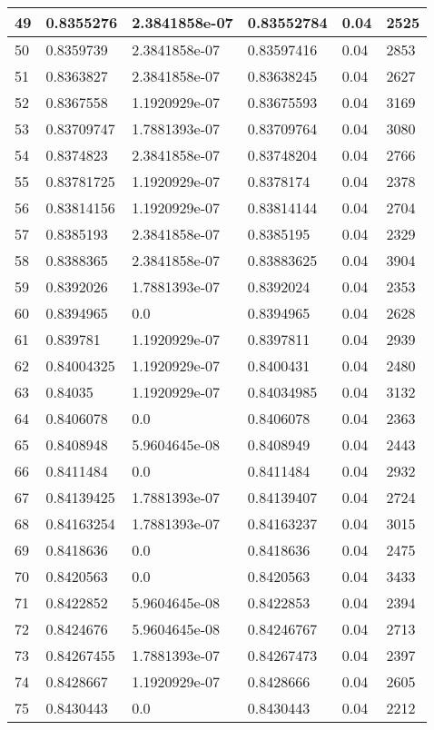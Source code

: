 \begin{longtable}{|l|l|l|l|l|l|}
49 & 0.8355276 & 2.3841858e-07 & 0.83552784 & 0.04 & 2525 \\ \hline 
50 & 0.8359739 & 2.3841858e-07 & 0.83597416 & 0.04 & 2853 \\ \hline 
51 & 0.8363827 & 2.3841858e-07 & 0.83638245 & 0.04 & 2627 \\ \hline 
52 & 0.8367558 & 1.1920929e-07 & 0.83675593 & 0.04 & 3169 \\ \hline 
53 & 0.83709747 & 1.7881393e-07 & 0.83709764 & 0.04 & 3080 \\ \hline 
54 & 0.8374823 & 2.3841858e-07 & 0.83748204 & 0.04 & 2766 \\ \hline 
55 & 0.83781725 & 1.1920929e-07 & 0.8378174 & 0.04 & 2378 \\ \hline 
56 & 0.83814156 & 1.1920929e-07 & 0.83814144 & 0.04 & 2704 \\ \hline 
57 & 0.8385193 & 2.3841858e-07 & 0.8385195 & 0.04 & 2329 \\ \hline 
58 & 0.8388365 & 2.3841858e-07 & 0.83883625 & 0.04 & 3904 \\ \hline 
59 & 0.8392026 & 1.7881393e-07 & 0.8392024 & 0.04 & 2353 \\ \hline 
60 & 0.8394965 & 0.0 & 0.8394965 & 0.04 & 2628 \\ \hline 
61 & 0.839781 & 1.1920929e-07 & 0.8397811 & 0.04 & 2939 \\ \hline 
62 & 0.84004325 & 1.1920929e-07 & 0.8400431 & 0.04 & 2480 \\ \hline 
63 & 0.84035 & 1.1920929e-07 & 0.84034985 & 0.04 & 3132 \\ \hline 
64 & 0.8406078 & 0.0 & 0.8406078 & 0.04 & 2363 \\ \hline 
65 & 0.8408948 & 5.9604645e-08 & 0.8408949 & 0.04 & 2443 \\ \hline 
66 & 0.8411484 & 0.0 & 0.8411484 & 0.04 & 2932 \\ \hline 
67 & 0.84139425 & 1.7881393e-07 & 0.84139407 & 0.04 & 2724 \\ \hline 
68 & 0.84163254 & 1.7881393e-07 & 0.84163237 & 0.04 & 3015 \\ \hline 
69 & 0.8418636 & 0.0 & 0.8418636 & 0.04 & 2475 \\ \hline 
70 & 0.8420563 & 0.0 & 0.8420563 & 0.04 & 3433 \\ \hline 
71 & 0.8422852 & 5.9604645e-08 & 0.8422853 & 0.04 & 2394 \\ \hline 
72 & 0.8424676 & 5.9604645e-08 & 0.84246767 & 0.04 & 2713 \\ \hline 
73 & 0.84267455 & 1.7881393e-07 & 0.84267473 & 0.04 & 2397 \\ \hline 
74 & 0.8428667 & 1.1920929e-07 & 0.8428666 & 0.04 & 2605 \\ \hline 
75 & 0.8430443 & 0.0 & 0.8430443 & 0.04 & 2212 \\ \hline 
\end{longtable}